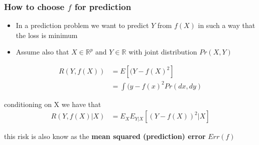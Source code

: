 \documentclass[
  shownotes,
  xcolor={svgnames},
  hyperref={colorlinks,citecolor=DarkBlue,linkcolor=DarkRed,urlcolor=DarkBlue}
  ]{beamer}
\begin{document}

\begin{frame}
\frametitle{How to choose $f$ for prediction}
\begin{itemize}
  \item In a prediction problem we want to predict $Y$ from $f(X)$ in such a way that the loss is minimum
  \item Assume also that $X \in \mathbb{R}^p$ and $Y \in \mathbb{R}$ with joint distribution $Pr(X,Y)$
\end{itemize}

\begin{align}
  R(Y,f(X)) &=E[(Y-f(X)^2] \\
            &=\int (y-f(x)^2 Pr(dx,dy)
\end{align}

conditioning on X we have that
\begin{align}
 R(Y,f(X)|X) &= E_X E_{Y|X} [(Y-f(X))^2|X] 
\end{align}

this risk is also know as the {\bf mean squared (prediction) error} $Err(f)$
\end{frame}
\end{document}
